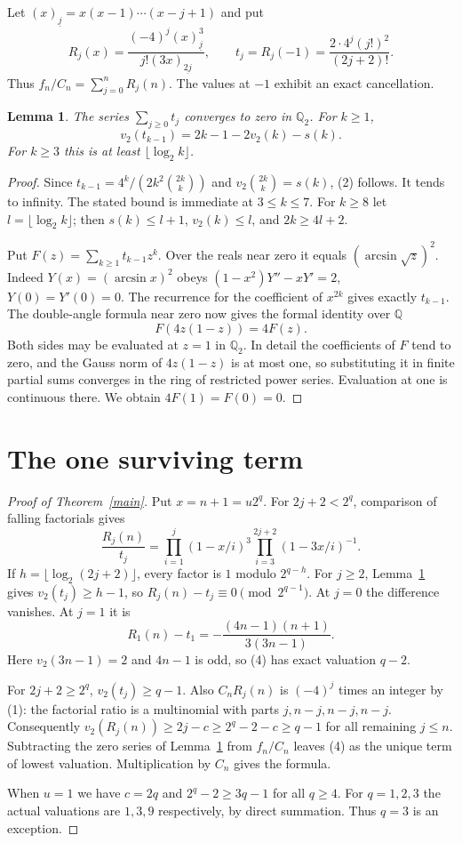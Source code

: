 \documentclass[11pt]{article}
\newtheorem{lemma}[theorem]{Lemma}
\newcommand{\ord}{v_2}
\newcommand{\Q}{\mathbb Q}
\begin{document}
Let $(x)_{\underline j}=x(x-1)\cdots(x-j+1)$ and put
\[
 R_j(x)=\frac{(-4)^j(x)_{\underline j}^3}{j!(3x)_{\underline{2j}}},
 \qquad
 t_j=R_j(-1)=\frac{2\cdot4^j(j!)^2}{(2j+2)!}.
\]
Thus $f_n/C_n=\sum_{j=0}^n R_j(n)$. The values at $-1$ exhibit an exact cancellation.
\begin{lemma}\label{vanish}
The series $\sum_{j\ge0}t_j$ converges to zero in $\Q_2$. For $k\ge1$,
\[
 \ord(t_{k-1})=2k-1-2\ord(k)-s(k).
 \tag{2}
\]
For $k\ge3$ this is at least $\lfloor\log_2 k\rfloor$.
\end{lemma}
\begin{proof}
Since $t_{k-1}=4^k/(2k^2\binom{2k}k)$ and $\ord\binom{2k}k=s(k)$, (2) follows. It tends to infinity. The stated bound is immediate at $3\le k\le7$. For $k\ge8$ let $l=\lfloor\log_2 k\rfloor$; then $s(k)\le l+1$, $\ord(k)\le l$, and $2k\ge4l+2$.

Put $F(z)=\sum_{k\ge1}t_{k-1}z^k$. Over the reals near zero it equals $(\arcsin\sqrt z)^2$. Indeed $Y(x)=(\arcsin x)^2$ obeys $(1-x^2)Y''-xY'=2$, $Y(0)=Y'(0)=0$. The recurrence for the coefficient of $x^{2k}$ gives exactly $t_{k-1}$. The double-angle formula near zero now gives the formal identity over $\Q$
\[
 F(4z(1-z))=4F(z).
\]
Both sides may be evaluated at $z=1$ in $\Q_2$. In detail the coefficients of $F$ tend to zero, and the Gauss norm of $4z(1-z)$ is at most one, so substituting it in finite partial sums converges in the ring of restricted power series. Evaluation at one is continuous there. We obtain $4F(1)=F(0)=0$.
\end{proof}

\section{The one surviving term}
\begin{proof}[Proof of Theorem~\ref{main}]
Put $x=n+1=u2^q$. For $2j+2<2^q$, comparison of falling factorials gives
\[
 \frac{R_j(n)}{t_j}=\prod_{i=1}^j(1-x/i)^3
               \prod_{i=3}^{2j+2}(1-3x/i)^{-1}.
 \tag{3}
\]
If $h=\lfloor\log_2(2j+2)\rfloor$, every factor is $1$ modulo $2^{q-h}$. For $j\ge2$, Lemma~\ref{vanish} gives $\ord(t_j)\ge h-1$, so $R_j(n)-t_j\equiv0\pmod{2^{q-1}}$. At $j=0$ the difference vanishes. At $j=1$ it is
\[
 R_1(n)-t_1=-\frac{(4n-1)(n+1)}{3(3n-1)}. \tag{4}
\]
Here $\ord(3n-1)=2$ and $4n-1$ is odd, so (4) has exact valuation $q-2$.

For $2j+2\ge2^q$, $\ord(t_j)\ge q-1$. Also $C_nR_j(n)$ is $(-4)^j$ times an integer by (1): the factorial ratio is a multinomial with parts $j,n-j,n-j,n-j$. Consequently $\ord(R_j(n))\ge2j-c\ge2^q-2-c\ge q-1$ for all remaining $j\le n$. Subtracting the zero series of Lemma~\ref{vanish} from $f_n/C_n$ leaves (4) as the unique term of lowest valuation. Multiplication by $C_n$ gives the formula.

When $u=1$ we have $c=2q$ and $2^q-2\ge3q-1$ for all $q\ge4$. For $q=1,2,3$ the actual valuations are $1,3,9$ respectively, by direct summation. Thus $q=3$ is an exception.
\end{proof}
\end{document}
